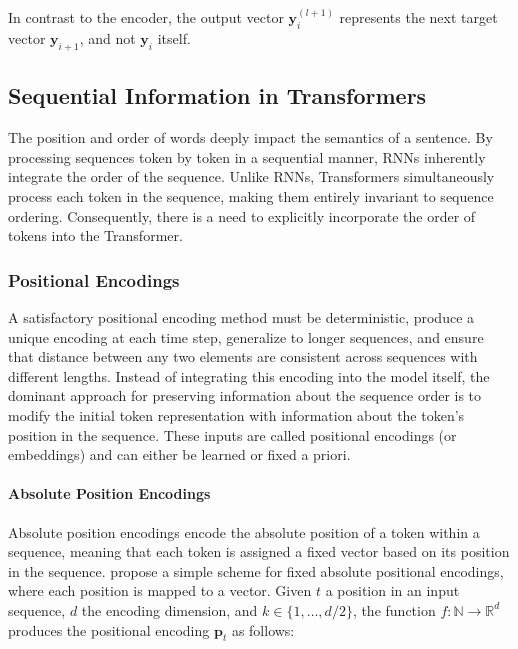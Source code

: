 In contrast to the encoder, the output vector $\bm{y}^{(l+1)}_i$ represents the next target vector $\bm{y}_{i+1}$, and not $\bm{y}_{i}$ itself.


\subsection{Sequential Information in Transformers}

The position and order of words deeply impact the semantics of a sentence. By processing sequences token by token in a sequential manner, \acp{RNN} inherently integrate the order of the sequence. Unlike \acp{RNN}, Transformers simultaneously process each token in the sequence, making them entirely invariant to sequence ordering. Consequently, there is a need to explicitly incorporate the order of tokens into the Transformer.

\subsubsection{Positional Encodings} 


A satisfactory positional encoding method must be deterministic, produce a unique encoding at each time step, generalize to longer sequences, and ensure that distance between any two elements are consistent across sequences with different lengths. Instead of integrating this encoding into the model itself, the dominant approach for preserving information about the sequence order is to modify the initial token representation with information about the token's position in the sequence. These inputs are called positional encodings (or embeddings) and can either be learned or fixed a priori. %


\paragraph{Absolute Position Encodings}

Absolute position encodings encode the absolute position of a token within a sequence, meaning that each token is assigned a fixed vector based on its position in the sequence. \citet{vaswani2017attention} propose a simple scheme for fixed absolute positional encodings, where each position is mapped to a vector. Given $t$ a position in an input sequence, $d$ the encoding dimension, and $k \in \{1, \ldots, d/2\}$, the function $f: \mathbb{N} \rightarrow \mathbb{R}^d$ produces the positional encoding $\bm{p}_t$ as follows:

